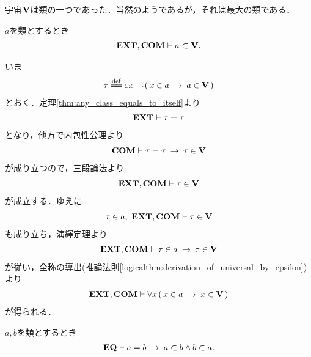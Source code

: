 	宇宙$\mathbf{V}$は類の一つであった．当然のようであるが，それは最大の類である．
	\begin{screen}
		\begin{thm}
			$a$を類とするとき
			\begin{align}
				\mbox{{\bf EXT}},\mbox{\bf COM} \vdash a \subset \mathbf{V}.
			\end{align}
		\end{thm}
	\end{screen}
	
	\begin{sketch}
		いま
		\begin{align}
			\tau \defeq \varepsilon x \negation (\, x \in a \rarrow a \in \Univ\, )
		\end{align}
		とおく．定理\ref{thm:any_class_equals_to_itself}より
		\begin{align}
			\mbox{{\bf EXT}} \vdash \tau = \tau
		\end{align}
		となり，他方で内包性公理より
		\begin{align}
			\mbox{\bf COM} \vdash \tau = \tau \hspace{0.25em}\rightarrow\hspace{0.25em} \tau \in \mathbf{V}
		\end{align}
		が成り立つので，三段論法より
		\begin{align}
			\mbox{{\bf EXT}},\mbox{\bf COM} \vdash \tau \in \mathbf{V}
		\end{align}
		が成立する．ゆえに
		\begin{align}
			\tau \in a,\ \mbox{{\bf EXT}},\mbox{\bf COM} \vdash \tau \in \mathbf{V}
		\end{align}
		も成り立ち，演繹定理より
		\begin{align}
			\mbox{{\bf EXT}},\mbox{\bf COM} \vdash \tau \in a \hspace{0.25em}\rightarrow\hspace{0.25em} \tau \in \mathbf{V}
		\end{align}
		が従い，全称の導出(推論法則\ref{logicalthm:derivation_of_universal_by_epsilon})より
		\begin{align}
			\mbox{{\bf EXT}},\mbox{\bf COM} \vdash \forall x\, (\, x \in a \hspace{0.25em}\rightarrow\hspace{0.25em} x \in \mathbf{V}\, )
		\end{align}
		が得られる．
		\QED
	\end{sketch}
	
	\begin{screen}
		\begin{thm}[等しい類は相手を包含する]
		\label{thm:equivalent_classes_includes_the_other}
			$a,b$を類とするとき
			\begin{align}
				\mbox{{\bf EQ}} \vdash a = b \hspace{0.25em}\rightarrow\hspace{0.25em} a \subset b \wedge b \subset a.
			\end{align}
		\end{thm}
	\end{screen}
	
